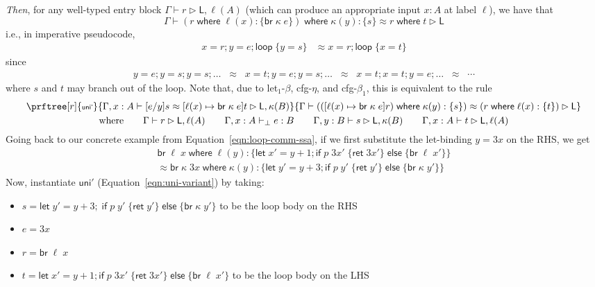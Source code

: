 \documentclass[acmsmall,screen,review]{acmart}
\newcommand{\ms}[1]{\ensuremath{\mathsf{#1}}}
\newcommand{\lto}{:}
\newcommand{\letexpr}[3]{\ensuremath{\ms{let}\;#1 = #2;\;#3}}
\newcommand{\letstmt}[3]{\ensuremath{\ms{let}\;#1 = #2; #3}}
\newcommand{\brb}[2]{\ms{br}\;#1\;#2}
\newcommand{\where}[2]{#1\;\ms{where}\;#2}
\newcommand{\wbranch}[3]{#1(#2) \lto \{#3\}}
\newcommand{\bhyp}[2]{#1 : #2}
\newcommand{\rle}[1]{{\scriptsize\textsf{#1}}}
\newcommand{\hasty}[4]{#1 \vdash_{#2} #3: {#4}}
\newcommand{\haslb}[3]{#1 \vdash #2 \rhd #3}
\newcommand{\teqv}{\approx}
\newcommand{\lbeq}[4]{#1 \vdash #2 \teqv #3 \rhd {#4}}
\newcommand{\brle}[1]{{\textsf{#1}}}
\begin{document}
\emph{Then}, for any well-typed entry block $\haslb{\Gamma}{r}{\ms{L}, \ell(A)}$ (which can produce
an appropriate input $x : A$ at label $\ell$), we have that
$$
  \lbeq{\Gamma}{\where{(\where{r}{\wbranch{\ell}{x}{\brb{\kappa}{e}}})}
    {\wbranch{\kappa}{y}{s}}}{\where{r}{t}}{\ms{L}}
$$
i.e., in imperative pseudocode,
\begin{align}
  x = r; y = e; \ms{loop}\;\{ y = s \}  & \teqv x = r; \ms{loop}\;\{ x = t \}
\end{align}
since
\begin{align}
  y = e ; y = s ; y = s ; \ldots 
  \;\;\teqv\;\;
  x = t ; y = e ; y = s ; \ldots 
  \;\;\teqv\;\;
  x = t ; x = t ; y = e ; \ldots 
  \;\;\teqv\;\; \cdots
\end{align}
where $s$ and $t$ may branch out of the loop. 
%
Note that, due to \brle{let$_1$-$\beta$}, \brle{cfg-$\eta$}, and \brle{cfg-$\beta_1$}, this is
equivalent to the rule
\begin{equation}
\begin{gathered}
\prftree[r]{\rle{uni'}}
{
  \lbeq{\Gamma, \bhyp{x}{A}}
    {[e/y]s}
    {[\ell(x) \mapsto \brb{\kappa}{e}]t}
    {\ms{L}, \kappa(B)}
}
{
  \lbeq{\Gamma}
    {(\where{([\ell(x) \mapsto \brb{\kappa}{e}]r)}{\wbranch{\kappa}{y}{s}})}
    {(\where{r}{\wbranch{\ell}{x}{t}})}
    {\ms{L}}
} \\
\text{where} \qquad
{
  \haslb{\Gamma}{r}{\ms{L}, \ell(A)} 
} \qquad
{
  \hasty{\Gamma, \bhyp{x}{A}}{\bot}{e}{B} 
} \qquad
{
  \haslb{\Gamma, \bhyp{y}{B}}{s}{\ms{L}, \kappa(B)}
} \qquad
{
  \haslb{\Gamma, \bhyp{x}{A}}{t}{\ms{L}, \ell(A)}
}
\end{gathered}
\label{eqn:uni-variant}
\end{equation}
Going back to our concrete example from Equation~\ref{eqn:loop-comm-ssa}, if we first substitute the
let-binding $y = 3x$ on the RHS, we get
\begin{multline}
  \where{\brb{\ell}{x}}{\wbranch{\ell}{y}
    {\letstmt{x'}{y + 1}{\ms{if}\;p\;3x'\;\{\ms{ret}\;3x'\}\;\ms{else}\;\{\brb{\ell}{x'}\}}}}
  \\ \teqv
  \where{\brb{\kappa}{3x}}{\wbranch{\kappa}{y}
    {\letstmt{y'}{y + 3}{\ms{if}\;p\;y'\;\{\ms{ret}\;y'\}\;\ms{else}\;\{\brb{\kappa}{y'}\}}}}
  \label{eqn:loop-comm-red}
\end{multline}
Now, instantiate $\brle{uni}'$ (Equation~\ref{eqn:uni-variant}) by taking:
\begin{itemize}
  \item
    $s = \letexpr{y'}{y + 3}{\ms{if}\;p\;y'\;\{\ms{ret}\;y'\}\;\ms{else}\;\{\brb{\kappa}{y'}\}}$ 
    to be the loop body on the RHS
  \item $e = 3x$
  \item $r = \brb{\ell}{x}$
  \item $t = \letstmt{x'}{y + 1}{\ms{if}\;p\;3x'\;\{\ms{ret}\;3x'\}\;\ms{else}\;\{\brb{\ell}{x'}\}}$
  to be the loop body on the LHS
\end{itemize}
\end{document}

